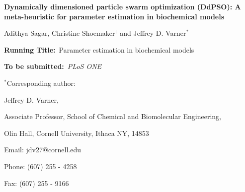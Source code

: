 \documentclass[12pt]{article}
\begin{document}
\begin{titlepage}
{\par\centering\textbf{\Large {Dynamically dimensioned particle swarm optimization (DdPSO): A meta-heuristic for parameter estimation in biochemical models}}}
\vspace{0.05in}
{\par \centering \large{Adithya Sagar, Christine Shoemaker$^{\dag}$ and Jeffrey D. Varner$^{*}$}}
\vspace{0.10in}
{\par {}}
{\par {}}
{\par {}}
\vspace{0.1in}
{\par \centering \textbf{Running Title:}~Parameter estimation in biochemical models}
\vspace{0.1in}
{\par \centering \textbf{To be submitted:}~\emph{PLoS ONE}}
\vspace{0.5in}
{\par \centering $^{*}$Corresponding author:}
{\par \centering Jeffrey D. Varner,}
{\par \centering Associate Professor, School of Chemical and Biomolecular Engineering,}
{\par {} Olin Hall, Cornell University, Ithaca NY, 14853}
{\par \centering Email: jdv27@cornell.edu}
{\par \centering Phone: (607) 255 - 4258}
{\par \centering Fax: (607) 255 - 9166}
\end{titlepage}
\date{}
\thispagestyle{empty}
\pagebreak
\end{document}
